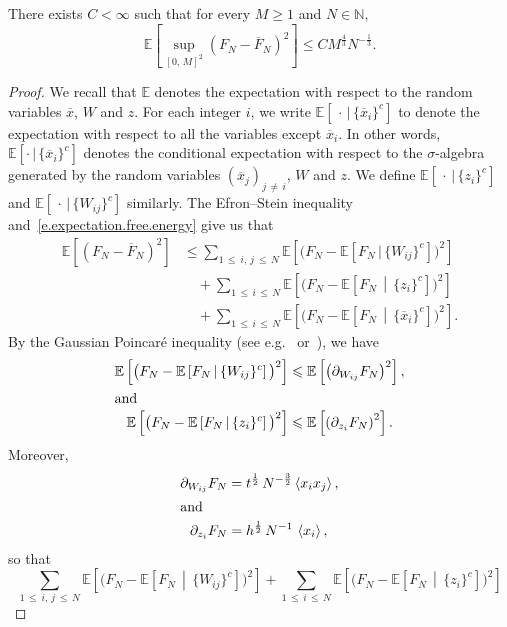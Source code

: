 \documentclass[AHL,Unicode,longabstracts,published]{cedram}
\newcommand{\N}{\mathbb{N}}
\newcommand{\E}{\mathbb{E}}
\newcommand{\1}{\mathds{1}}
\renewcommand{\le}{\leqslant}
\renewcommand{\ge}{\geqslant}
\newcommand{\la}{\left\langle}
\newcommand{\ra}{\right\rangle}
\renewcommand{\bar}{\overline}
\begin{document}
\begin{lemm}\label{l.concentration}
There exists $C < \infty$ such that for every $M \ge 1$ and $N \in \N$,
\[
\E \left[\sup_{\left[0,\,M\right]^2} \left(F_N - \bar F_N \right)^2 \right] \le C M^\frac 4 3 N^{-\frac 1 3}.
\]
\end{lemm}
\begin{proof}
We recall that $\E$ denotes the expectation with respect to the random variables $\bar x$, $W$ and $z$. For each integer $i$, we write $\E[\,\cdot\,|\,\{\bar x_{i}\}^c]$ to denote the expectation with respect to all the variables except $\bar x_i$. In other words, $\E[\cdot\,|\,\{\bar x_{i}\}^c]$ denotes the conditional expectation with respect to the $\sigma$-algebra generated by the random variables $(\bar x_j)_{j\,\neq\,i}$, $W$ and $z$. We define $\E[\,\cdot\,|\,\{z_{i}\}^c]$ and $\E[\,\cdot\,|\,\{W_{ij}\}^c]$ similarly. The Efron--Stein inequality and~\eqref{e.expectation.free.energy} give us that
\begin{align*}
\E \left[\left(F_N - \bar F_N \right)^2 \right] & \le \sum_{1\,\le\: i,\,j\:\le\,N} \E \left[\big(F_N - \E\left[F_N\,|\,\{W_{ij}\}^c\right]\big)^2 \right]
\\
& \quad + \sum_{1\,\le\,i\,\le\,N} \E \left[\big(F_N - \E\left[F_N \,\middle|\, \{z_{i}\}^c\right]\big)^2 \right]
\\
& \quad + \sum_{1\,\le\,i\,\le\,N} \E \left[\big(F_N - \E\left[F_N\,\middle|\, \{\bar x_{i}\}^c\right]\big)^2 \right].
\end{align*}
By the Gaussian Poincaré inequality (see e.g.~\cite[(2.5)]{chatterjee} or~\cite{poincare}), we have
\begin{align*}
\E \left[\big(F_N - \E\left[F_N \, \middle| \, \{W_{ij}\}^c \right]\big)^2 \right] &\le \E \left[\left(\partial_{W_{ij}} F_N \right) ^2 \right],
\\
\intertext{and}
\E \left[\big(F_N - \E\left[F_N \, \middle| \, \{z_{i}\}^c\right]\big)^2 \right] &\le \E \left[\left(\partial_{z_i} F_N \right) ^2 \right].
\end{align*}
Moreover,
\begin{align*}
\partial_{W_{ij}} F_N &= t^\frac 1 2 \, N^{-\frac 3 2} \la x_i x_j \ra,
\\
\intertext{and}
\partial_{z_i} F_N &= h^\frac 1 2 \, N^{-1} \, \la x_i \ra,
\end{align*}
so that
\[
\sum_{1\,\le\:i,\,j\:\le\,N} \E \left[\big(F_N - \E[F_N \, \middle| \, \{W_{ij}\}^c]\big)^2 \right] +
\sum_{1\,\le\,i\,\le\,N} \E \left[\big(F_N - \E[F_N \, \middle| \, \{z_{i}\}^c]\big)^2 \right]
\]
\end{proof}
\end{document}
